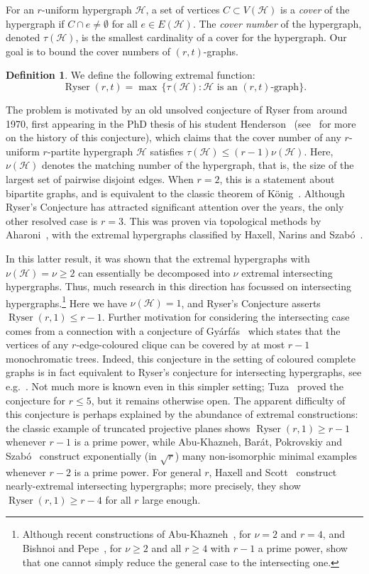\documentclass[a4paper,twoside,11pt]{article}
\numberwithin{thm}{section}
\theoremstyle{definition}
\newtheorem{dfn}[thm]{Definition}
\theoremstyle{remark}
\theoremstyle{definition}
\def\cH{{\mathcal H}}
\newcommand{\m}[1]{\mathcal{#1}}
\DeclareMathOperator{\Ryser}{Ryser}
\begin{document}
For an $r$-uniform hypergraph $\cH$, a set of vertices $C\subset V(\cH)$ is a \emph{cover} of the hypergraph if $C\cap e \neq \emptyset$ for all $e\in E(\cH)$. The \emph{cover number} of the hypergraph, denoted $\tau(\cH)$, is the smallest cardinality of a cover for the hypergraph.  Our goal is to bound the cover numbers of $(r,t)$-graphs. 
\begin{dfn} \label{def:extremalfunction} We define the following extremal function:
\[\Ryser(r,t) = \max \, \{ \tau(\m H) : \m H \text{ is an $(r,t)$-graph} \}.\]
\end{dfn}

The problem is motivated by an old unsolved conjecture of Ryser from around 1970, first appearing in the PhD thesis of his student Henderson~\cite{Henderson71} (see~\cite{Best-Wanless18} for more on the history of this conjecture), which claims that the cover number of any $r$-uniform $r$-partite hypergraph $\m H$ satisfies $\tau(\m H) \le (r - 1) \nu(\m H)$. Here, $\nu(\m H)$ denotes the matching number of the hypergraph, that is, the size of the largest set of pairwise disjoint edges. 
When $r = 2$, this is a statement about bipartite graphs, and is equivalent to the classic theorem of K\"onig~\cite{Koenig}.  Although Ryser's Conjecture has attracted significant attention over the years, the only other resolved case is $r = 3$. This was proven via topological methods by Aharoni~\cite{Aharoni01}, with the extremal hypergraphs classified by Haxell, Narins and Szab\'o~\cite{HNS18}.

In this latter result, it was shown that the extremal hypergraphs with $\nu(\m H) = \nu \ge 2$ can essentially be decomposed into $\nu$ extremal intersecting hypergraphs. Thus, much research in this direction has focussed on intersecting hypergraphs.\footnote{Although recent constructions of Abu-Khazneh~\cite{Abu16}, for $\nu = 2$ and $r = 4$, and Bishnoi and Pepe~\cite{BP18}, for $\nu \ge 2$ and all $r \ge 4$ with $r-1$ a prime power, show that one cannot simply reduce the general case to the intersecting one.}  
Here we have $\nu(\m H) = 1$, and Ryser's Conjecture asserts $\Ryser(r,1) \le r-1$. Further motivation for considering the intersecting case comes from a connection with a conjecture of Gy\'arf\'as~\cite{gyarfasconj} which states that the vertices of any $r$-edge-coloured clique can be covered by at most $r-1$ monochromatic trees. Indeed, this conjecture in the setting of coloured complete graphs is in fact equivalent to Ryser's conjecture for intersecting hypergraphs, see e.g.~\cite{kirsolo}.
Not much more is known even in this simpler setting; Tuza~\cite{Tuza} proved the conjecture for $r \le 5$, but it remains otherwise open. The apparent difficulty of this conjecture is perhaps explained by the abundance of extremal constructions: the classic example of truncated projective planes shows $\Ryser(r,1) \ge r-1$ whenever $r-1$ is a prime power, while Abu-Khazneh, Bar\'at, Pokrovskiy and Szab\'o~\cite{ABPS19} construct exponentially (in $\sqrt{r}$) many non-isomorphic minimal examples whenever $r-2$ is a prime power. For general $r$, Haxell and Scott~\cite{HS17} construct nearly-extremal intersecting hypergraphs; more precisely, they show $\Ryser(r,1) \ge r-4$ for all $r$ large enough.
\end{document}
